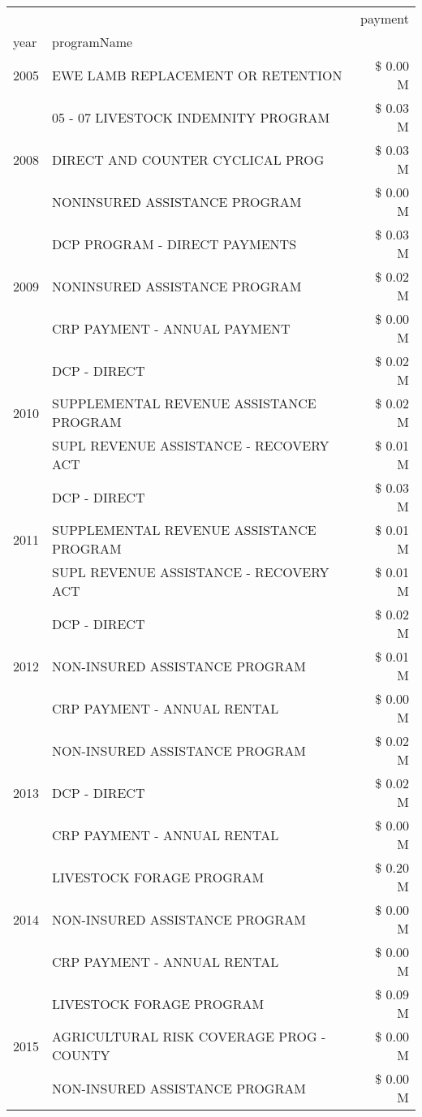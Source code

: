 \begin{tabular}{llr}
\toprule
 &  & payment \\
year & programName &  \\
\midrule
2005 & EWE LAMB REPLACEMENT OR RETENTION & \$ 0.00 M \\
\cline{1-3}
\multirow[t]{3}{*}{2008} & 05 - 07 LIVESTOCK INDEMNITY PROGRAM & \$ 0.03 M \\
 & DIRECT AND COUNTER CYCLICAL PROG & \$ 0.03 M \\
 & NONINSURED ASSISTANCE PROGRAM & \$ 0.00 M \\
\cline{1-3}
\multirow[t]{3}{*}{2009} & DCP PROGRAM - DIRECT PAYMENTS & \$ 0.03 M \\
 & NONINSURED ASSISTANCE PROGRAM & \$ 0.02 M \\
 & CRP PAYMENT - ANNUAL PAYMENT & \$ 0.00 M \\
\cline{1-3}
\multirow[t]{3}{*}{2010} & DCP - DIRECT & \$ 0.02 M \\
 & SUPPLEMENTAL REVENUE ASSISTANCE PROGRAM & \$ 0.02 M \\
 & SUPL REVENUE ASSISTANCE - RECOVERY ACT & \$ 0.01 M \\
\cline{1-3}
\multirow[t]{3}{*}{2011} & DCP - DIRECT & \$ 0.03 M \\
 & SUPPLEMENTAL REVENUE ASSISTANCE PROGRAM & \$ 0.01 M \\
 & SUPL REVENUE ASSISTANCE - RECOVERY ACT & \$ 0.01 M \\
\cline{1-3}
\multirow[t]{3}{*}{2012} & DCP - DIRECT & \$ 0.02 M \\
 & NON-INSURED ASSISTANCE PROGRAM & \$ 0.01 M \\
 & CRP PAYMENT - ANNUAL RENTAL & \$ 0.00 M \\
\cline{1-3}
\multirow[t]{3}{*}{2013} & NON-INSURED ASSISTANCE PROGRAM & \$ 0.02 M \\
 & DCP - DIRECT & \$ 0.02 M \\
 & CRP PAYMENT - ANNUAL RENTAL & \$ 0.00 M \\
\cline{1-3}
\multirow[t]{3}{*}{2014} & LIVESTOCK FORAGE PROGRAM & \$ 0.20 M \\
 & NON-INSURED ASSISTANCE PROGRAM & \$ 0.00 M \\
 & CRP PAYMENT - ANNUAL RENTAL & \$ 0.00 M \\
\cline{1-3}
\multirow[t]{3}{*}{2015} & LIVESTOCK FORAGE PROGRAM & \$ 0.09 M \\
 & AGRICULTURAL RISK COVERAGE PROG - COUNTY & \$ 0.00 M \\
 & NON-INSURED ASSISTANCE PROGRAM & \$ 0.00 M \\

\end{tabular}
